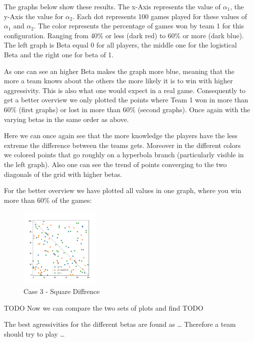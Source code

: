 The graphs below show these results. The x-Axis represents the value of $\alpha_1$, the y-Axis the value for $\alpha_2$. Each dot represents 100 games played for these values of $\alpha_1$ and $\alpha_2$. The color represents the percentage of games won by team 1 for this configuration. Ranging from 40$\%$ or less (dark red) to 60$\%$ or more (dark blue). The left graph is Beta equal 0 for all players, the middle one for the logistical Beta and the right one for beta of 1.

As one can see an higher Beta makes the graph more blue, meaning that the more a team knows about the others the more likely it is to win with higher aggressivity. This is also what one would expect in a real game.
Consequently to get a better overview we only plotted the points where Team 1 won in more than 60$\%$ (first graphs) or lost in more than 60$\%$ (second graphs). Once again with the varying betas in the same order as above.

\newpage
Here we can once again see that the more knowledge the players have the less extreme the difference between the teams gets. Moreover in the different colors we colored points that go roughly on a hyperbola branch (particularly visible in the left graph). Also one can see the trend of points converging to the two diagonals of the grid with higher betas.


For the better overview we have plotted all values in one graph, where you win  more than 60$\%$ of the games:

\begin{figure}[!ht]
    \centering
    \includegraphics[width=0.35\textwidth]{Bilder/simulation_16}
    \caption{Case 3 - Square Diffrence}
    \label{fig:meine-grafik}
\end{figure}


TODO
Now we can compare the two sets of plots and find TODO

The best agressivities for the different betas are found as … Therefore a team should try to play …


